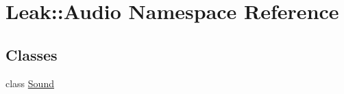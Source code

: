 \hypertarget{namespace_leak_1_1_audio}{}\section{Leak\+:\+:Audio Namespace Reference}
\label{namespace_leak_1_1_audio}
\subsection*{Classes}
\begin{DoxyCompactItemize}
\item 
class \hyperlink{class_leak_1_1_audio_1_1_sound}{Sound}
\end{DoxyCompactItemize}
